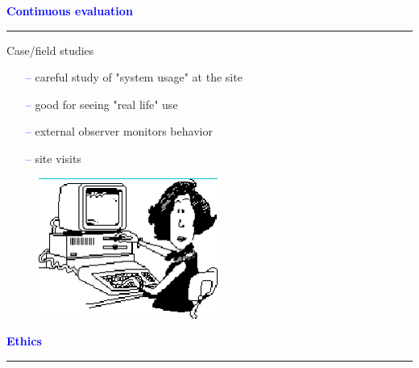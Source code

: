 \documentclass[pdf]{beamer}
\begin{document}
{{{{{{{{{{{%
{
\begin{frame}
	\vspace{8mm}
	\textcolor{Blue}{\textbf{\large{Continuous evaluation}}}
    \textcolor{red}{\rule{10cm}{1mm}}
    
    {\Large Case/field studies}
    \begin{itemize}
      \item[\textcolor{Blue}{--}] careful study of "system usage" at the site
      \item[\textcolor{Blue}{--}] good for seeing "real life" use
      \item[\textcolor{Blue}{--}] external observer monitors behavior 
      \item[\textcolor{Blue}{--}] site visits
    \end{itemize}
    \vspace{12mm}
    \begin{figure}[b]
    	\includegraphics[scale = 0.5, right]{34_Imagine.png}
    \end{figure}
\end{frame}


{
\begin{frame}
	\vspace{8mm}
	\textcolor{Blue}{\textbf{\large{Ethics}}}
    \textcolor{red}{\rule{10cm}{1mm}}
    

\end{frame}}}}}}}}}}}}}}
\end{document}
